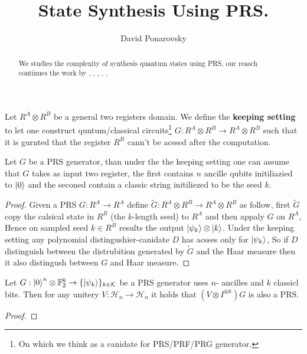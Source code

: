 \documentclass[manuscript,screen,review]{acmart}
\begin{document}

\title{State Synthesis Using PRS.} 
\author{David Ponarovsky}
\maketitle

\begin{abstract}
  We studies the complexity of synthesis quantum states using PRS, our reasch continues the work by \cite{searchtodecision}, \cite{rosenthal2023efficient}, \cite{rosenthal2021interactive}, \cite{metger2023stateqip}, \cite{delavenne2023quantum}.
\end{abstract}

\begin{definition} Let $R^{A}\otimes R^{B}$ be a general two registers domain. We define the \textbf{keeping setting} to let one construct quntum/classical circuits\footnote{On which we think as a canidate for PRS/PRF/PRG generator.} $G : R^{A}\otimes R^{B} \rightarrow R^{A} \otimes R^{B}$ such that it is gurnted that the register $R^{B}$ cann't be acssed after the computation.   
\end{definition}

\begin{claim}
  Let $G$ be a PRS generator, than under the the keeping setting one can assume that $G$ takes as input two register, the first contains $n$ ancille qubits initiliazied to $\ket{0}$ and the seconed contain a classic string initiliezed to be the seed $k$.  
\end{claim}

\begin{proof}
  Given a PRS $G : R^{A} \rightarrow R^{A}$ define $\tilde{G} : R^{A} \otimes R^{B} \rightarrow R^{A} \otimes R^{B}$ as follow, first $\tilde{G}$ copy the calsical state in $R^{B}$ (the $k$-length seed) to $R^{A}$ and then appaly $G$ on $R^{A}$, Hence on sampled seed $k \in R^{B}$ results the output $ \ket{\psi_{k}}\otimes\ket{k}$. Under the keeping setting any polynomial distingushier-canidate $D$ has acsses only for $\ket{\psi_{k}}$, So if $D$ distinguish between the distrubition generated by $\tilde{G}$ and the Haar measure then it also distingush between $G$ and Haar measure. 
\end{proof}

\begin{claim}
  Let $G : \ket{0}^{n} \otimes \mathbb{F}_{2}^{k} \rightarrow \{ \ket{\psi_{k}} \}_{k \in \mathcal{K}}$ be a PRS generator uses $n$- ancilles and $k$ classicl bits. Then for any unitery $V: \mathcal{H}_{n} \rightarrow \mathcal{H}_{n}$ it holds that $(V \otimes I^{\otimes k} ) G$ is also a PRS.
\end{claim}
\begin{proof}
   
\end{proof}
\end{document}
